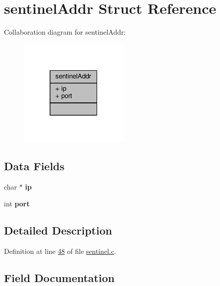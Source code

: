 \hypertarget{structsentinelAddr}{}\section{sentinel\+Addr Struct Reference}
\label{structsentinelAddr}


Collaboration diagram for sentinel\+Addr\+:\nopagebreak
\begin{figure}[H]
\begin{center}
\leavevmode
\includegraphics[width=151pt]{structsentinelAddr__coll__graph}
\end{center}
\end{figure}
\subsection*{Data Fields}
\begin{DoxyCompactItemize}
\item 
\mbox{\label{structsentinelAddr_aeee9b2ddc722212bc6a10e3e78f1ab50}} 
char $\ast$ {\bfseries ip}
\item 
\mbox{\label{structsentinelAddr_a8198758f2cd8b884aa6eda42bc8e40fb}} 
int {\bfseries port}
\end{DoxyCompactItemize}


\subsection{Detailed Description}


Definition at line \hyperlink{sentinel_8c_source_l00048}{48} of file \hyperlink{sentinel_8c_source}{sentinel.\+c}.



\subsection{Field Documentation}
\mbox{\label{structsentinelAddr_aeee9b2ddc722212bc6a10e3e78f1ab50}} 
